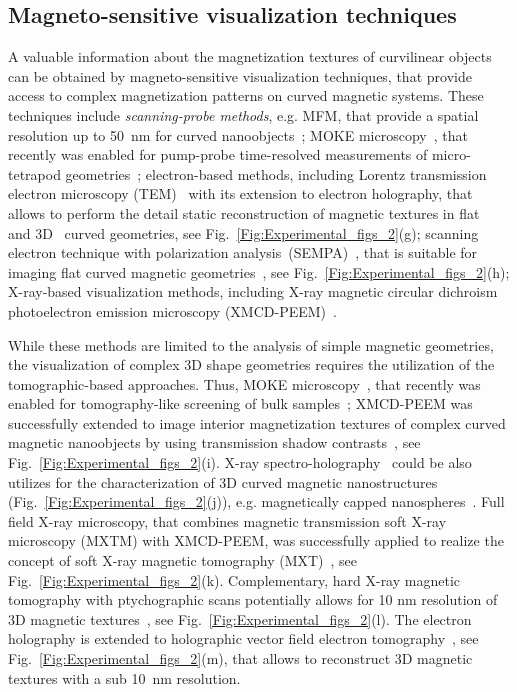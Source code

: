 \subsection{Magneto-sensitive visualization techniques}

A valuable information about the magnetization textures of curvilinear objects can be obtained by magneto-sensitive visualization techniques, that provide access to complex magnetization patterns on curved magnetic systems. These techniques include \textit{scanning-probe methods}, e.g. MFM, that provide a spatial resolution up to 50~nm for curved nanoobjects~\cite{Ulbrich06,Makarov07,Makarov08,Makarov09,Schulze10,Albrecht12,Nguyen15,Streubel16,Ball17,May19}; MOKE microscopy~\cite{Streubel12b,Streubel13c,Streubel14,Ueltzhoeffer16,Hunt20}, that recently was enabled for pump-probe time-resolved measurements of micro-tetrapod geometries~\cite{Sahoo18}; electron-based methods, including Lorentz transmission electron microscopy (TEM)~\cite{Phatak12,Phatak11} with its extension to electron holography, that allows to perform the detail static reconstruction of magnetic textures in flat~\cite{Klaeui05,Nord19} and 3D~\cite{Biziere13,Phatak14,Phatak20} curved geometries, see Fig.~\ref{Fig:Experimental_figs_2}(g); scanning electron technique with polarization analysis~(SEMPA)~\cite{Schoenke18}, that is suitable for imaging flat curved magnetic geometries~\cite{Klaui05,Schoenke20}, see Fig.~\ref{Fig:Experimental_figs_2}(h); X-ray-based visualization methods, including X-ray magnetic circular dichroism photoelectron emission microscopy (XMCD-PEEM)~\cite{Streubel15c,Streubel15,Streubel16,Volkov19,Volkov19c}.  

While these methods are limited to the analysis of simple magnetic geometries, the visualization of complex 3D shape geometries requires the utilization of the tomographic-based approaches. Thus, MOKE microscopy~\cite{Streubel14}, that recently was enabled for tomography-like screening of bulk samples~\cite{Schaefer20}; XMCD-PEEM was successfully extended to image interior magnetization textures of complex curved magnetic nanoobjects by using transmission shadow contrasts~\cite{Kimling11,Streubel12,Streubel12b,Streubel14a,DaCol14,Stano18a,Wartelle18,Schoebitz19,Wartelle19}, see Fig.~\ref{Fig:Experimental_figs_2}(i). X-ray spectro-holography~\cite{Eisebitt04} could be also utilizes for the characterization of 3D curved magnetic nanostructures (Fig.~\ref{Fig:Experimental_figs_2}(j)), e.g. magnetically capped nanospheres~\cite{Guenther10}. Full field X-ray microscopy, that combines magnetic transmission
soft X-ray microscopy (MXTM) with XMCD-PEEM, was successfully applied to realize the concept of soft X-ray magnetic tomography (MXT)~\cite{Streubel15a}, see Fig.~\ref{Fig:Experimental_figs_2}(k). Complementary, hard X-ray magnetic tomography with ptychographic scans potentially allows for 10 nm resolution of 3D magnetic textures~\cite{Donnelly17}, see Fig.~\ref{Fig:Experimental_figs_2}(l). The electron holography is extended to holographic vector field electron tomography~\cite{Wolf13,Wolf19}, see Fig.~\ref{Fig:Experimental_figs_2}(m), that allows to reconstruct 3D magnetic textures with a sub 10~nm resolution. 

